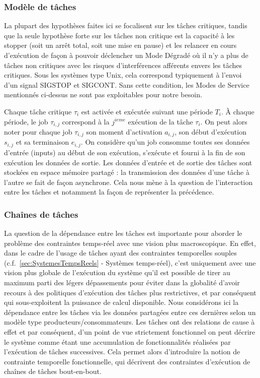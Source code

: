 \documentclass[french, a4paper, 11pt, twoside, pdftex]{StyleThese}
\begin{document}
    	
    	\subsubsection{Modèle de tâches}
		La plupart des hypothèses faites ici se focalisent sur les tâches critiques, tandis que la seule hypothèse forte sur les tâches non critique est la capacité à les stopper (soit un arrêt total, soit une mise en pause) et les relancer en cours d'exécution de façon à pouvoir déclencher un Mode Dégradé où il n'y a plus de tâches non critiques avec les risques d'interférences afférents envers les tâches critiques. Sous les systèmes type Unix, cela correspond typiquement à l'envoi d'un signal SIGSTOP et SIGCONT. Sans cette condition, les Modes de Service mentionnés ci-dessus ne sont pas exploitables pour notre besoin. 
		
		Chaque tâche critique $\tau_i$ est activée et exécutée suivant une période $T_i$. 
		À chaque période, le job $\tau_{i,j}$ correspond à la $j^{ieme}$ exécution de la tâche $\tau_i$. 
		On peut alors noter pour chaque job $\tau_{i,j}$ son moment d'activation $a_{i,j}$, son début d'exécution $s_{i,j}$ et sa terminaison $e_{i,j}$. 
		On considère qu'un job consomme toutes ses données d'entrée (inputs) au début de son exécution, s'exécute et fourni à la fin de son exécution les données de sortie. Les données d'entrée et de sortie des tâches sont stockées en espace mémoire partagé : la transmission des données d'une tâche à l'autre se fait de façon asynchrone.
		Cela nous mène à la question de l'interaction entre les tâches et notamment la façon de représenter la précédence.
    	
    	\subsubsection{Chaînes de tâches}
	    La question de la dépendance entre les tâches est importante pour aborder le problème des contraintes temps-réel avec une vision plus macroscopique. En effet, dans le cadre de l'usage de tâches ayant des contraintes temporelles souples (c.f.~\autoref{sec:SystemesTempsReels} - Systèmes temps-réel), c'est uniquement avec une vision plus globale de l'exécution du système qu'il est possible de tirer au maximum parti des légers dépassements pour éviter dans la globalité d'avoir recours à des politiques d'exécution des tâches plus restrictives, et par conséquent qui sous-exploitent la puissance de calcul disponible.
	    Nous considérons ici la dépendance entre les tâches via les données partagées entre ces dernières selon un modèle type producteurs/consommateurs. Les tâches ont des relations de cause à effet et par conséquent, d'un point de vue strictement fonctionnel on peut décrire le système comme étant une accumulation de fonctionnalités réalisées par l'exécution de tâches successives. Cela permet alors d'introduire la notion de contrainte temporelle fonctionnelle, qui décrivent des contraintes d'exécution de chaînes de tâches bout-en-bout.
	    
\end{document}
